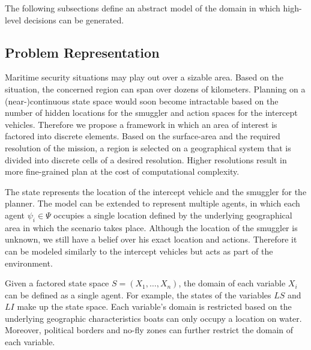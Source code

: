 \documentclass[conference]{IEEEtran}
\begin{document}

The following subsections define an abstract model of the domain in which high-level decisions can be generated.

\subsection{Problem Representation}
\label{sub:problem-rep}

Maritime security situations may play out over a sizable area. Based on the situation, the concerned region can span over dozens of kilometers. Planning on a (near-)continuous state space would soon become intractable based on the number of hidden locations for the smuggler and action spaces for the intercept vehicles. Therefore we propose a framework in which an area of interest is factored into discrete elements. Based on the surface-area and the required resolution of the mission, a region is selected on a geographical system that is divided into discrete cells of a desired resolution. Higher resolutions result in more fine-grained plan at the cost of computational complexity.

The state represents the location of the intercept vehicle and the smuggler for the planner. The model can be extended to represent multiple agents, in which each agent $\psi_i\in\Psi$ occupies a single location defined by the underlying geographical area in which the scenario takes place. Although the location of the smuggler is unknown, we still have a belief over his exact location and actions. Therefore it can be modeled similarly to the intercept vehicles but acts as part of the environment.

Given a factored state space $S = \left(X_1, \ldots, X_n\right)$, the domain of each variable $X_i$ can be defined as a single agent. For example, the states of the variables $LS$ and $LI$ make up the state space. Each variable's domain is restricted based on the underlying geographic characteristics \ie boats can only occupy a location on water. Moreover, political borders and no-fly zones can further restrict the domain of each variable.
\end{document}
